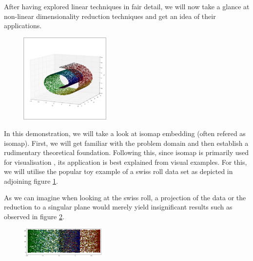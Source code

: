 After having explored linear techniques in fair detail, we will now take a glance at non-linear dimensionality reduction techniques and get an idea of their applications.

\begin{figure}
	\centering
	\includegraphics[width=0.4\textwidth]{external_content/graphs/swiss_roll.png}
	\captionsetup{justification=centering}
	\label{fig:swissrollfull}
\end{figure}

In this demonstration, we will take a look at isomap embedding (often refered as isomap).
First, we will get familiar with the problem domain and then establish a rudimentary theoretical foundation.
Following this, since isomap is primarily used for visualisation \cite{HandsOnMLCh8}, its application is best explained from visual examples.
For this, we will utilise the popular toy example of a swiss roll data set as depicted in adjoining figure \ref{fig:swissrollfull}.

As we can imagine when looking at the swiss roll, a projection of the data or the reduction to a \gls{singular} plane would merely yield insignificant results such as observed in figure \ref{fig:swissrollprojection}.

\begin{figure}
	\centering
	\includegraphics[width=0.38\textwidth]{external_content/graphs/swiss_roll-projection.png}
	\captionsetup{justification=centering}
	\label{fig:swissrollprojection}
\end{figure}

